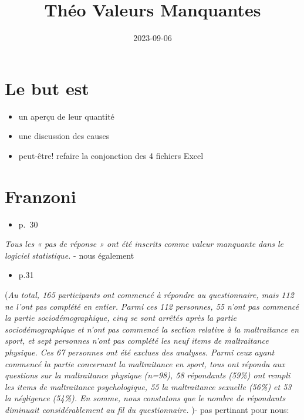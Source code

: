 \documentclass[
]{article}
\title{Théo Valeurs Manquantes}
\author{}
\date{\vspace{-2.5em}2023-09-06}
\providecommand{\tightlist}{%
  \setlength{\itemsep}{0pt}\setlength{\parskip}{0pt}}
\begin{document}
\maketitle

\hypertarget{le-but-est}{%
\section{Le but est}\label{le-but-est}}

\begin{itemize}
\tightlist
\item
  un aperçu de leur quantité
\item
  une discussion des causes
\item
  peut-être! refaire la conjonction des 4 fichiers Excel
\end{itemize}

\hypertarget{franzoni}{%
\section{Franzoni}\label{franzoni}}

\begin{itemize}
\tightlist
\item
  p.~30
\end{itemize}

\emph{Tous les « pas de réponse » ont été inscrits comme valeur
manquante dans le logiciel statistique.} - nous également

\begin{itemize}
\tightlist
\item
  p.31
\end{itemize}

(\emph{Au total, 165 participants ont commencé à répondre au
questionnaire, mais 112 ne l'ont pas complété en entier. Parmi ces 112
personnes, 55 n'ont pas commencé la partie sociodémographique, cinq se
sont arrêtés après la partie sociodémographique et n'ont pas commencé la
section relative à la maltraitance en sport, et sept personnes n'ont pas
complété les neuf items de maltraitance physique. Ces 67 personnes ont
été exclues des analyses. Parmi ceux ayant commencé la partie concernant
la maltraitance en sport, tous ont répondu aux questions sur la
maltraitance physique (n=98), 58 répondants (59\%) ont rempli les items
de maltraitance psychologique, 55 la maltraitance sexuelle (56\%) et 53
la négligence (54\%). En somme, nous constatons que le nombre de
répondants diminuait considérablement au fil du questionnaire.} )- pas
pertinant pour nous:
\end{document}
